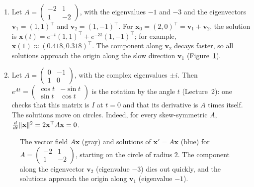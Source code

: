\begin{example}\label{L3-ex:linear-ode}
    \begin{enumerate}
        \item Let $A = \begin{pmatrix} -2 & 1 \\ 1 & -2 \end{pmatrix}$, with the eigenvalues $-1$ and $-3$ and the eigenvectors $\mathbf{v}_1 = (1, 1)^\top$ and $\mathbf{v}_2 = (1, -1)^\top$. For $\mathbf{x}_0 = (2, 0)^\top = \mathbf{v}_1 + \mathbf{v}_2$, the solution is $\mathbf{x}(t) = e^{-t}(1, 1)^\top + e^{-3t}(1, -1)^\top$; for example, $\mathbf{x}(1) \approx (0.418, 0.318)^\top$. The component along $\mathbf{v}_2$ decays faster, so all solutions approach the origin along the slow direction $\mathbf{v}_1$ (Figure~\ref{L3-fig:ode}).
        \item Let $A = \begin{pmatrix} 0 & -1 \\ 1 & 0 \end{pmatrix}$, with the complex eigenvalues $\pm i$. Then $e^{At} = \begin{pmatrix} \cos t & -\sin t \\ \sin t & \cos t \end{pmatrix}$ is the rotation by the angle $t$ (Lecture~2): one checks that this matrix is $I$ at $t = 0$ and that its derivative is $A$ times itself. The solutions move on circles. Indeed, for every skew-symmetric $A$, $\frac{d}{dt}\lVert \mathbf{x} \rVert^2 = 2\mathbf{x}^\top A\mathbf{x} = 0$.
    \end{enumerate}
\end{example}

\begin{figure}[ht]
    \centering
    \caption{The vector field $A\mathbf{x}$ (gray) and solutions of $\mathbf{x}' = A\mathbf{x}$ (blue) for $A = \left(\begin{smallmatrix} -2 & 1 \\ 1 & -2 \end{smallmatrix}\right)$, starting on the circle of radius $2$. The component along the eigenvector $\mathbf{v}_2$ (eigenvalue $-3$) dies out quickly, and the solutions approach the origin along $\mathbf{v}_1$ (eigenvalue $-1$).}
    \label{L3-fig:ode}
\end{figure}

